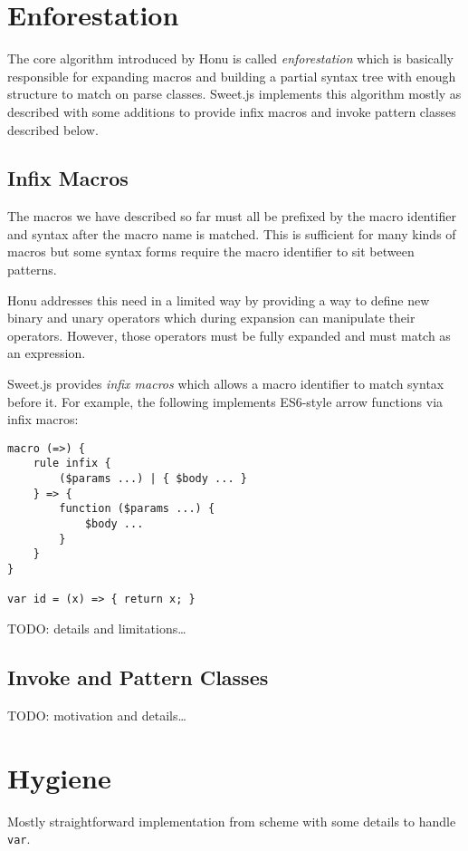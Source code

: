 \documentclass[preprint,10pt]{sigplanconf}
\begin{document}
\section{Enforestation}
\label{sec-4}

The core algorithm introduced by Honu is called \emph{enforestation} which
is basically responsible for expanding macros and building a partial
syntax tree with enough structure to match on parse classes. Sweet.js
implements this algorithm mostly as described with some additions to
provide infix macros and invoke pattern classes described below.

\subsection{Infix Macros}
\label{sec-4-1}
The macros we have described so far must all be prefixed by the macro
identifier and syntax after the macro name is matched. This is
sufficient for many kinds of macros but some syntax forms require the
macro identifier to sit between patterns.

Honu addresses this need in a limited way by providing a way to define
new binary and unary operators which during expansion can manipulate
their operators. However, those operators must be fully expanded and
must match as an expression.

Sweet.js provides \emph{infix macros} which allows a macro identifier to
match syntax before it. For example, the following implements
ES6-style arrow functions via infix macros:

\begin{verbatim}
macro (=>) {
    rule infix {
        ($params ...) | { $body ... }
    } => {
        function ($params ...) {
            $body ...
        }
    }
}

var id = (x) => { return x; }
\end{verbatim}

TODO: details and limitations\ldots{}
\subsection{Invoke and Pattern Classes}
\label{sec-4-2}

TODO: motivation and details\ldots{}

\section{Hygiene}
\label{sec-5}

Mostly straightforward implementation from scheme with some details to
handle \texttt{var}.
\end{document}
